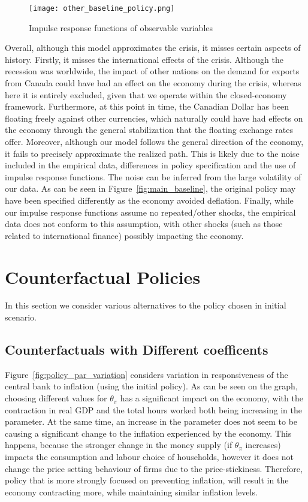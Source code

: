 \documentclass[12pt]{article}
\begin{document}
\begin{figure}[!h]
    \caption{Impulse response functions of observable variables}\label{fig:other_baseline}
    \centering
    \texttt{[image: other\_baseline\_policy.png]}
\end{figure}

Overall, although this model approximates the crisis, it misses certain aspects of history. Firstly, it misses the international effects of the crisis. Although the recession was worldwide, the impact of other nations on the demand for exports from Canada could have had an effect on the economy during the crisis, whereas here it is entirely excluded, given that we operate within the closed-economy framework. Furthermore, at this point in time, the Canadian Dollar has been floating freely against other currencies, which naturally could have had effects on the economy through the general stabilization that the floating exchange rates offer. Moreover, although our model follows the general direction of the economy, it fails to precisely approximate the realized path. This is likely due to the noise included in the empirical data, differences in policy specification and the use of impulse response functions. The noise can be inferred from the large volatility of our data. As can be seen in Figure~\ref{fig:main_baseline}, the original policy may have been specified differently as the economy avoided deflation. Finally, while our impulse response functions assume no repeated/other shocks, the empirical data does not conform to this assumption, with other shocks (such as those related to international finance) possibly impacting the economy.

\newpage
\section{Counterfactual Policies}\label{s:counterfactual_policy}
In this section we consider various alternatives to the policy chosen in initial scenario.

\subsection*{Counterfactuals with Different coefficents}

Figure~\ref{fig:policy_par_variation} considers variation in responsiveness of the central bank to inflation (using the initial policy). As can be seen on the graph, choosing different values for $\theta_{\pi}$ has a significant impact on the economy, with the contraction in real GDP and the total hours worked both being increasing in the parameter. At the same time, an increase in the parameter does not seem to be causing a significant change to the inflation experienced by the economy. This happens, because the stronger change in the money supply (if $\theta_\pi$ increases) impacts the consumption and labour choice of households, however it does not change the price setting behaviour of firms due to the price-stickiness. Therefore, policy that is more strongly focused on preventing inflation, will result in the economy contracting more, while maintaining similar inflation levels.
\end{document}
